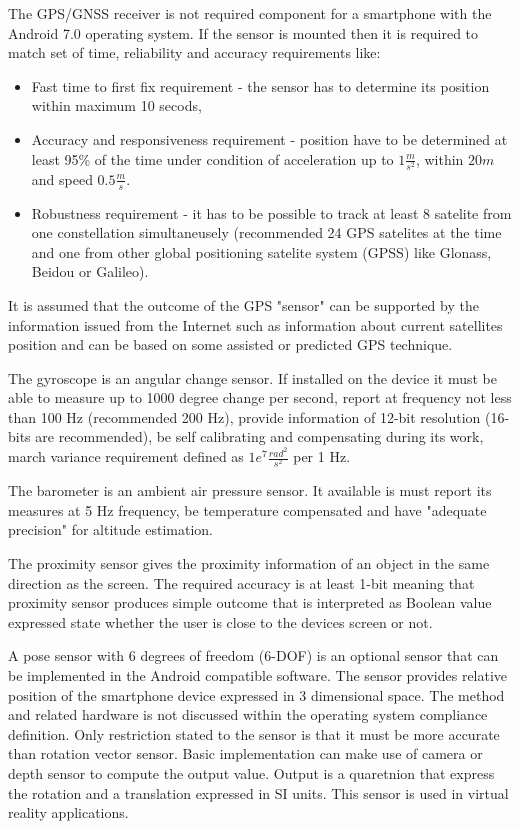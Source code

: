 \documentclass[../main.tex]{subfiles}
\begin{document}
The GPS/GNSS receiver is not required component for a smartphone with the Android 7.0 operating system. If the sensor is mounted then it is required to match set of time, reliability and accuracy requirements like:
\begin{itemize}
	\item Fast time to first fix requirement - the sensor has to determine its position within maximum 10 secods,
	\item Accuracy and responsiveness requirement - position have to be determined at least 95\% of the time under condition of acceleration up to $ 1 \frac{m}{s^2} $, within $ 20 m $ and speed $ 0.5 \frac{m}{s} $.
	\item Robustness requirement - it has to be possible to track at least 8 satelite from one constellation simultaneusely (recommended 24 GPS satelites at the time and one from other global positioning satelite system (GPSS) like Glonass, Beidou or Galileo).
\end{itemize}
It is assumed that the outcome of the GPS "sensor" can be supported by the information issued from the Internet such as information about current satellites position and can be based on some assisted or predicted GPS technique.

The gyroscope is an angular change sensor. If installed on the device it must be able to measure up to 1000 degree change per second, report at frequency not less than 100 Hz (recommended 200 Hz), provide information of 12-bit resolution (16-bits are recommended), be self calibrating and compensating during its work, march variance requirement defined as $ 1e^7 \frac{rad^2}{s^2} $ per 1 Hz.

The barometer is an ambient air pressure sensor. It available is must report its measures at 5 Hz frequency, be temperature compensated and have "adequate precision" for altitude estimation.

The proximity sensor gives the proximity information of an object in the same direction as the screen. The required accuracy is at least 1-bit meaning that proximity sensor produces simple outcome that is interpreted as Boolean value expressed state whether the user is close to the devices screen or not.

A pose sensor with 6 degrees of freedom (6-DOF) is an optional sensor that can be implemented in the Android compatible software. The sensor provides relative position of the smartphone device expressed in 3 dimensional space. The method and related hardware is not discussed within the operating system compliance definition. Only restriction stated to the sensor is that it must be more accurate than rotation vector sensor. Basic implementation can make use of camera or depth sensor to compute the output value. Output is a quaretnion that express the rotation and a translation expressed in SI units. This sensor is used in virtual reality applications.
\end{document}
